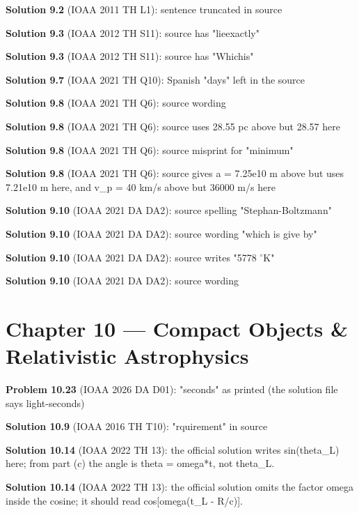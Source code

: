 \noindent\textbf{Solution 9.2} (IOAA 2011 TH L1): sentence truncated in source
\smallskip

\noindent\textbf{Solution 9.3} (IOAA 2012 TH S11): source has "lieexactly"
\smallskip

\noindent\textbf{Solution 9.3} (IOAA 2012 TH S11): source has "Whichis"
\smallskip

\noindent\textbf{Solution 9.7} (IOAA 2021 TH Q10): Spanish "days" left in the source
\smallskip

\noindent\textbf{Solution 9.8} (IOAA 2021 TH Q6): source wording
\smallskip

\noindent\textbf{Solution 9.8} (IOAA 2021 TH Q6): source uses 28.55 pc above but 28.57 here
\smallskip

\noindent\textbf{Solution 9.8} (IOAA 2021 TH Q6): source misprint for "minimum"
\smallskip

\noindent\textbf{Solution 9.8} (IOAA 2021 TH Q6): source gives a = 7.25e10 m above but uses 7.21e10 m here, and v\_p = 40 km/s above but 36000 m/s here
\smallskip

\noindent\textbf{Solution 9.10} (IOAA 2021 DA DA2): source spelling "Stephan-Boltzmann"
\smallskip

\noindent\textbf{Solution 9.10} (IOAA 2021 DA DA2): source wording "which is give by"
\smallskip

\noindent\textbf{Solution 9.10} (IOAA 2021 DA DA2): source writes "5778 $^\circ$K"
\smallskip

\noindent\textbf{Solution 9.10} (IOAA 2021 DA DA2): source wording
\smallskip

\section*{Chapter 10 --- Compact Objects \& Relativistic Astrophysics}

\noindent\textbf{Problem 10.23} (IOAA 2026 DA D01): "seconds" as printed (the solution file says light-seconds)
\smallskip

\noindent\textbf{Solution 10.9} (IOAA 2016 TH T10): "rquirement" in source
\smallskip

\noindent\textbf{Solution 10.14} (IOAA 2022 TH 13): the official solution writes sin(theta\_L) here; from part (c) the angle is theta = omega*t, not theta\_L.
\smallskip

\noindent\textbf{Solution 10.14} (IOAA 2022 TH 13): the official solution omits the factor omega inside the cosine; it should read cos[omega(t\_L - R/c)].
\smallskip

